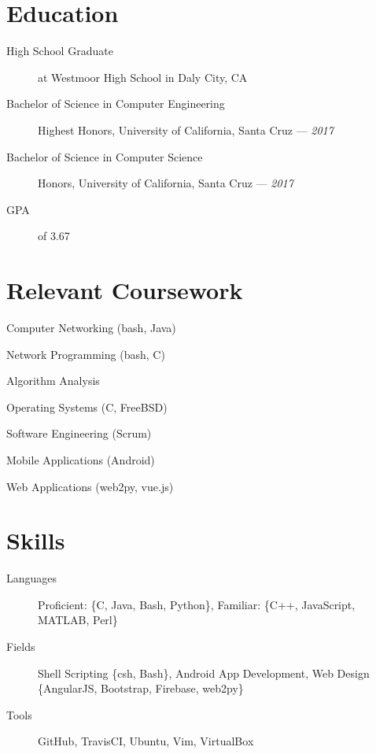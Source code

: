 \documentclass[10pt]{article}
\author{August Valera}
\begin{document}

\section*{Education}
\begin{description}
  \item[High School Graduate] at Westmoor High School in Daly City, CA
  \item[Bachelor of Science in Computer Engineering] Highest Honors, University of California, Santa Cruz --- \textit{2017}
  \item[Bachelor of Science in Computer Science] Honors, University of California, Santa Cruz --- \textit{2017}
  \item[GPA] of 3.67
\end{description}

\section*{Relevant Coursework}
\begin{itemize}
    \begin{multicols}{2}
    \item Computer Networking (bash, Java) %
    \item Network Programming (bash, C) %
    \item Algorithm Analysis %
    \item Operating Systems (C, FreeBSD) %
    \item Software Engineering (Scrum) %
    \item Mobile Applications (Android) %
    \item Web Applications (web2py, vue.js) %
    \end{multicols}
\end{itemize}

\section*{Skills}
\begin{description}
  \item[Languages] Proficient: \{C, Java, Bash, Python\},
    Familiar: \{C++, JavaScript, MATLAB, Perl\}
  \item[Fields] Shell Scripting \{csh, Bash\}, Android App Development, Web
    Design \{AngularJS, Bootstrap, Firebase, web2py\}
  \item[Tools] GitHub, TravisCI, Ubuntu, Vim, VirtualBox
\end{description}
\end{document}
